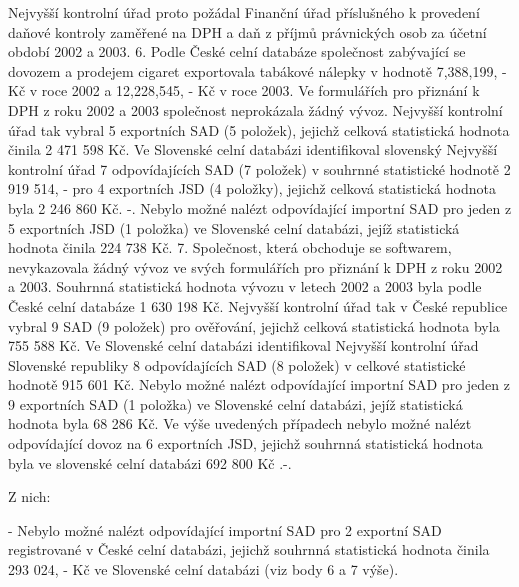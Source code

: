 \documentclass[10pt]{article}
\begin{document}
Nejvyšší kontrolní úřad proto požádal Finanční úřad příslušného k provedení daňové kontroly zaměřené na DPH a daň z příjmů právnických osob za účetní období 2002 a 2003.
6. Podle České celní databáze společnost zabývající se dovozem a prodejem cigaret exportovala tabákové nálepky v hodnotě 7,388,199, - Kč v roce 2002 a 12,228,545, - Kč v roce 2003.
Ve formulářích pro přiznání k DPH z roku 2002 a 2003 společnost neprokázala žádný vývoz.
Nejvyšší kontrolní úřad tak vybral 5 exportních SAD (5 položek), jejichž celková statistická hodnota činila 2 471 598 Kč.
Ve Slovenské celní databázi identifikoval slovenský Nejvyšší kontrolní úřad 7 odpovídajících SAD (7 položek) v souhrnné statistické hodnotě 2 919 514, - pro 4 exportních JSD (4 položky), jejichž celková statistická hodnota byla 2 246 860 Kč. -.
Nebylo možné nalézt odpovídající importní SAD pro jeden z 5 exportních JSD (1 položka) ve Slovenské celní databázi, jejíž statistická hodnota činila 224 738 Kč.
7. Společnost, která obchoduje se softwarem, nevykazovala žádný vývoz ve svých formulářích pro přiznání k DPH z roku 2002 a 2003.
Souhrnná statistická hodnota vývozu v letech 2002 a 2003 byla podle České celní databáze 1 630 198 Kč.
Nejvyšší kontrolní úřad tak v České republice vybral 9 SAD (9 položek) pro ověřování, jejichž celková statistická hodnota byla 755 588 Kč.
Ve Slovenské celní databázi identifikoval Nejvyšší kontrolní úřad Slovenské republiky 8 odpovídajících SAD (8 položek) v celkové statistické hodnotě 915 601 Kč.
Nebylo možné nalézt odpovídající importní SAD pro jeden z 9 exportních SAD (1 položka) ve Slovenské celní databázi, jejíž statistická hodnota byla 68 286 Kč.
Ve výše uvedených případech nebylo možné nalézt odpovídající dovoz na 6 exportních JSD, jejichž souhrnná statistická hodnota byla ve slovenské celní databázi 692 800 Kč .-.


Z nich:

- Nebylo možné nalézt odpovídající importní SAD pro 2 exportní SAD registrované v České celní databázi, jejichž souhrnná statistická hodnota činila 293 024, - Kč ve Slovenské celní databázi (viz body 6 a 7 výše).
\end{document}
